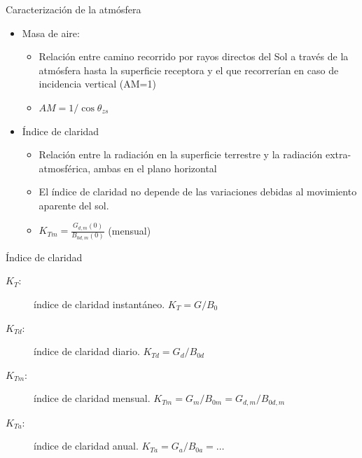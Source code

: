 \documentclass[xcolor={usenames,svgnames,dvipsnames}]{beamer}
\begin{document}
\begin{frame}[label={sec:org08705cb}]{Caracterización de la atmósfera}
\begin{itemize}
\item \alert{Masa de aire}:

\begin{itemize}
\item Relación entre camino recorrido por rayos directos del Sol a
través de la atmósfera hasta la superficie receptora y el que
recorrerían en caso de incidencia vertical (AM=1)

\item \(AM=1/\cos\theta_{zs}\)
\end{itemize}

\item \alert{Índice de claridad}

\begin{itemize}
\item Relación entre la radiación en la superficie terrestre y la
radiación extra-atmosférica, ambas en el plano horizontal

\item El índice de claridad \alert{no depende de las variaciones debidas al
movimiento aparente del sol}.

\item \(K_{Tm}=\frac{G_{d,m}(0)}{B_{0d,m}(0)}\) (mensual)
\end{itemize}
\end{itemize}
\end{frame}

\begin{frame}[label={sec:org9e13b6d}]{Índice de claridad}
\begin{description}
\item[{\(K_{T}\):}] índice de claridad instantáneo. \(K_{T}=G/B_{0}\)

\item[{\(K_{Td}\):}] índice de claridad diario. \(K_{Td}=G_{d}/B_{0d}\)

\item[{\(K_{Tm}\):}] índice de claridad mensual. \(K_{Tm}=G_{m}/B_{0m}=G_{d,m}/B_{0d,m}\)

\item[{\(K_{Ta}\):}] índice de claridad anual. \(K_{Ta} = G_{a}/B_{0a} = \dots\)
\end{description}
\end{frame}
\end{document}
